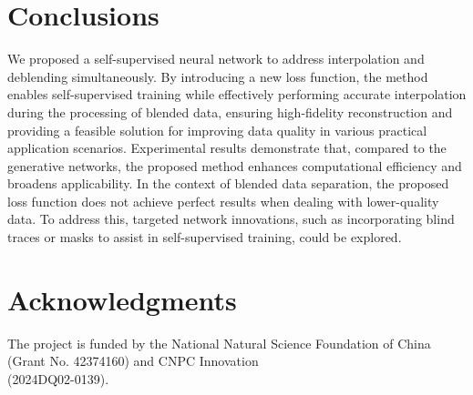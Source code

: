 \documentclass{segabs}
\begin{document}
\section{Conclusions}
We proposed a self-supervised neural network to address interpolation and deblending simultaneously. By introducing a new loss function, the method enables self-supervised training while effectively performing accurate interpolation during the processing of blended data, ensuring high-fidelity reconstruction and providing a feasible solution for improving data quality in various practical application scenarios. Experimental results demonstrate that, compared to the generative networks, the proposed method enhances computational efficiency and broadens applicability. In the context of blended data separation, the proposed loss function does not achieve perfect results when dealing with lower-quality data. To address this, targeted network innovations, such as incorporating blind traces or masks to assist in self-supervised training, could be explored.

\section{Acknowledgments}
The project is funded by the National Natural Science Foundation of China (Grant No. 42374160) and  CNPC Innovation\\(2024DQ02-0139).






%

\onecolumn




\end{document}
